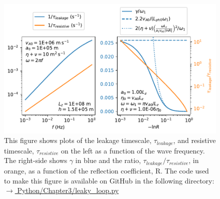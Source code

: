 \begin{figure}
    \vspace{-20pt}
    \centering
    \includegraphics[width=\textwidth,height=0.85\textheight,keepaspectratio]{figures/chapter03/leaky_loop.pdf}
    \vspace{-35pt}
    \caption{This figure shows plots of the leakage timescale, $\tau_{leakage}$, and resistive timescale, $\tau_{resistive}$ on the left as a function of the wave frequency. The right-side shows $\gamma$ in blue and the ratio, $\tau_{leakage}/\tau_{resistive}$, in orange, as a function of the reflection coefficient, R. The code used to make this figure is available on GitHub in the following directory:\newline
    \href{https://github.com/aleksyprok/apkp_thesis/blob/main/Python/Chapter3/leaky_loop.py}{$\rightarrow$ Python/Chapter3/leaky\_loop.py}}
    \label{fig:chap_3_leaky_loop}
    \vspace{-15pt}
\end{figure}

